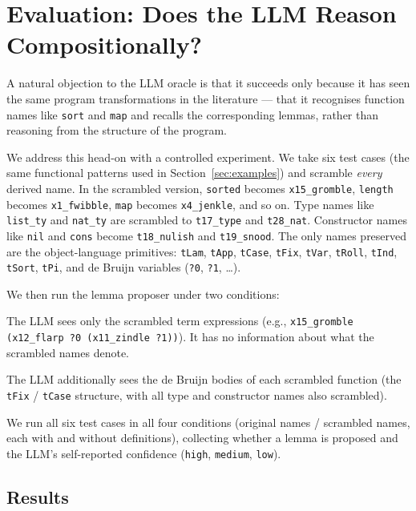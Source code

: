 \section{Evaluation: Does the LLM Reason Compositionally?}
\label{sec:eval}

A natural objection to the LLM oracle is that it succeeds only because
it has seen the same program transformations in the literature --- that
it recognises function names like \texttt{sort} and \texttt{map} and
recalls the corresponding lemmas, rather than reasoning from the
structure of the program.

We address this head-on with a controlled experiment.
We take six test cases (the same functional patterns used in
Section~\ref{sec:examples}) and scramble \emph{every} derived name.
In the scrambled version, \texttt{sorted} becomes \texttt{x15\_gromble},
\texttt{length} becomes \texttt{x1\_fwibble}, \texttt{map} becomes
\texttt{x4\_jenkle}, and so on.  Type names like \texttt{list\_ty} and
\texttt{nat\_ty} are scrambled to \texttt{t17\_type} and \texttt{t28\_nat}.
Constructor names like \texttt{nil} and \texttt{cons} become
\texttt{t18\_nulish} and \texttt{t19\_snood}.  The only names preserved
are the object-language primitives: \texttt{tLam}, \texttt{tApp},
\texttt{tCase}, \texttt{tFix}, \texttt{tVar}, \texttt{tRoll}, \texttt{tInd},
\texttt{tSort}, \texttt{tPi}, and de Bruijn variables (\texttt{?0},
\texttt{?1}, \ldots).

We then run the lemma proposer under two conditions:

\begin{description}[leftmargin=2em]
\item[Condition A (no-defs):] The LLM sees only the scrambled term
  expressions (e.g., \texttt{x15\_gromble (x12\_flarp ?0 (x11\_zindle
  ?1))}).  It has no information about what the scrambled names denote.
\item[Condition B (with-defs):] The LLM additionally sees the de Bruijn
  bodies of each scrambled function (the \texttt{tFix} / \texttt{tCase}
  structure, with all type and constructor names also scrambled).
\end{description}

We run all six test cases in all four conditions (original names /
scrambled names, each with and without definitions), collecting whether
a lemma is proposed and the LLM's self-reported confidence
(\texttt{high}, \texttt{medium}, \texttt{low}).

\subsection{Results}

